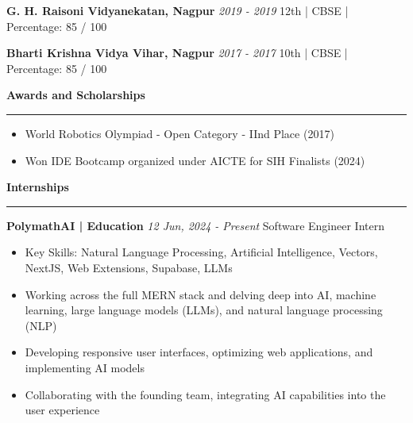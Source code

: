 \documentclass[a4paper,11pt]{article}
\renewcommand{\section}[1]{\vspace{0.5em}\textbf{\Large #1}\vspace{0.2em}\hrule\vspace{0.5em}}
\renewcommand{\subsection}[1]{\vspace{0.3em}\textbf{\large #1}\vspace{0.2em}}
\newcommand{\daterange}[2]{\textit{#1 - #2}}
\begin{document}
\subsection{G. H. Raisoni Vidyanekatan, Nagpur}
\daterange{2019}{2019}
12th | CBSE | Percentage: 85 / 100

\subsection{Bharti Krishna Vidya Vihar, Nagpur}
\daterange{2017}{2017}
10th | CBSE | Percentage: 85 / 100

\section{Awards and Scholarships}
\begin{itemize}
    \item World Robotics Olympiad - Open Category - IInd Place (2017)
    \item Won IDE Bootcamp organized under AICTE for SIH Finalists (2024)
\end{itemize}

\section{Internships}
\subsection{PolymathAI | Education}
\daterange{12 Jun, 2024}{Present}
Software Engineer Intern
\begin{itemize}
    \item Key Skills: Natural Language Processing, Artificial Intelligence, Vectors, NextJS, Web Extensions, Supabase, LLMs
    \item Working across the full MERN stack and delving deep into AI, machine learning, large language models (LLMs), and natural language processing (NLP)
    \item Developing responsive user interfaces, optimizing web applications, and implementing AI models
    \item Collaborating with the founding team, integrating AI capabilities into the user experience
\end{itemize}
\end{document}
